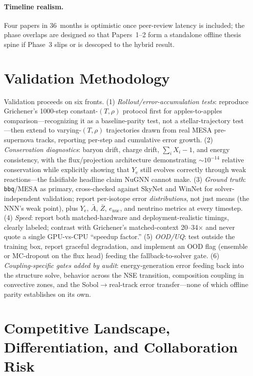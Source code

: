 \documentclass[11pt,a4paper]{article}
\newcommand{\Ye}{\ensuremath{Y_{\mathrm{e}}}}
\newcommand{\code}[1]{\texttt{#1}}
\begin{document}
\paragraph{Timeline realism.}
Four papers in 36~months is optimistic once peer-review latency is included; the phase overlaps are designed so that Papers~1--2 form a standalone offline thesis spine if Phase~3 slips or is descoped to the hybrid result.

\section{Validation Methodology}

Validation proceeds on six fronts. (1) \emph{Rollout/error-accumulation tests}: reproduce Grichener's 1000-step constant-$(T,\rho)$ protocol first for apples-to-apples comparison---recognizing it as a baseline-parity test, not a stellar-trajectory test---then extend to varying-$(T,\rho)$ trajectories drawn from real MESA pre-supernova tracks, reporting per-step and cumulative error growth. (2) \emph{Conservation diagnostics}: baryon drift, charge drift, $\sum_i X_i - 1$, and energy consistency, with the flux/projection architecture demonstrating ${\sim}10^{-14}$ relative conservation while explicitly showing that \Ye{} still evolves correctly through weak reactions---the falsifiable headline claim NuGNN cannot make. (3) \emph{Ground truth}: \code{bbq}/MESA as primary, cross-checked against SkyNet and WinNet for solver-independent validation; report per-isotope error \emph{distributions}, not just means (the NNN's weak point), plus \Ye, $\bar{A}$, $\bar{Z}$, $e_{\mathrm{nuc}}$, and neutrino metrics at every timestep. (4) \emph{Speed}: report both matched-hardware and deployment-realistic timings, clearly labeled; contrast with Grichener's matched-context 20--34$\times$ and never quote a single GPU-vs-CPU ``speedup factor.'' (5) \emph{OOD/UQ}: test outside the training box, report graceful degradation, and implement an OOD flag (ensemble or MC-dropout on the flux head) feeding the fallback-to-solver gate. (6) \emph{Coupling-specific gates added by audit}: energy-generation error feeding back into the structure solve, behavior across the NSE transition, composition coupling in convective zones, and the Sobol$\to$real-track error transfer---none of which offline parity establishes on its own.

\section{Competitive Landscape, Differentiation, and Collaboration Risk}
\end{document}
